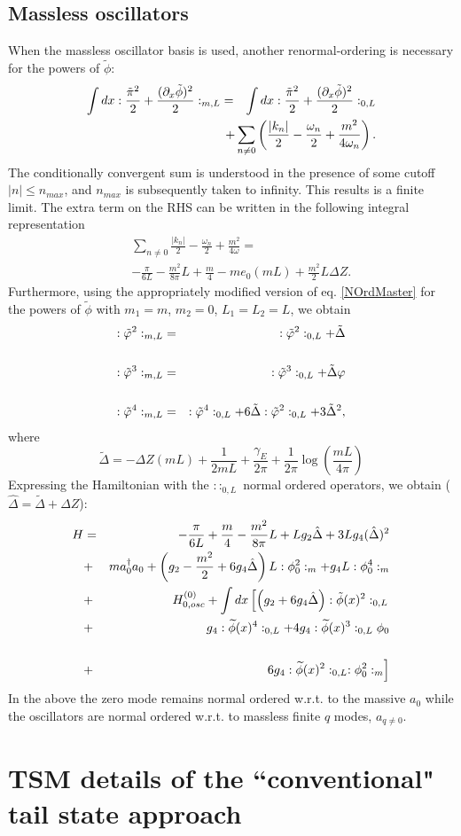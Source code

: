 \documentclass[twocolumn,secnumarabic,amssymb, nobibnotes, aps, prd]{revtex4-2}
\newcommand{\be}{\begin{equation}}
\newcommand{\ee}{\end{equation}}
\newcommand{\bea}{\begin{eqnarray}}
\newcommand{\eea}{\end{eqnarray}}
\begin{document}
\subsection{Massless oscillators}
When the massless oscillator basis is used, another renormal-ordering is necessary
for the powers of $\tilde\phi$:
\bea
\intop dx :\frac{\tilde\pi^2}{2}+\frac{(\partial_x \tilde\phi)^2}{2}:_{m,L}&=&\intop dx :\frac{\tilde\pi^2}{2}+\frac{(\partial_x \tilde\phi)^2}{2}:_{0,L}\nonumber\\
&&\hskip -.5in + \sum_{n\neq 0} \left(\frac{|k_n|}{2}-\frac{\omega_n}{2}+\frac{m^2}{4\omega_n}\right).
\eea
The conditionally convergent sum is understood in the presence of some cutoff $|n|\leq n_{max}$, and $n_{max}$ is subsequently taken to infinity. This results is a finite limit.
The extra term on the RHS can be written in the following integral representation
\bea
&&\sum_{n\neq 0} \frac{|k_n|}{2}-\frac{\omega_n}{2}+\frac{m^2}{4\omega}=\nonumber\\
&&-\frac{\pi}{6L}-\frac{m^2}{8\pi}L+\frac{m}{4}-me_0(mL)+\frac{m^2}{2}L\Delta Z.
\eea
Furthermore, using the appropriately modified version of eq. \eqref{NOrdMaster} for the powers of $\tilde\phi$ with $m_1=m$, $m_2=0$, $L_1=L_2=L$,
we obtain
\bea
:\tilde\varphi^2:_{m,L}&=&:\tilde\varphi^2:_{0,L}+\tilde\Delta\cr\cr
:\tilde\varphi^3:_{m,L}&=&:\tilde\varphi^3:_{0,L}+\tilde\Delta \varphi\cr\cr
:\tilde\varphi^4:_{m,L}&=&:\tilde\varphi^4:_{0,L}+6\tilde\Delta:\tilde\varphi^2:_{0,L}+3\tilde\Delta^2,
\eea
where
\be
\tilde\Delta= -\Delta Z(mL)+\frac{1}{2 m L}+\frac{\gamma_E}{2\pi}+\frac{1}{2\pi}\log\left(\frac{mL}{4\pi}\right)
\ee
Expressing the Hamiltonian with the $::_{0,L}$ normal ordered operators, we obtain
($\hat\Delta=\tilde\Delta+\Delta Z$):
\bea
H&=&-\frac{\pi}{6L}+\frac{m}{4}-\frac{m^2}{8\pi}L+L g_2\hat\Delta  + 3Lg_4(\hat\Delta)^2\nonumber\\
&+&m a_0^\dagger a_0+\left(g_2-\frac{m^2}{2}+6g_4\hat\Delta \right)L :\phi_0^2:_m+g_4 L :\phi_0^4:_m\nonumber\\
&+&H_{0,osc}^{(0)}+\intop dx \left[\left(g_2+6g_4\hat\Delta\right) :\tilde\phi(x)^2:_{0,L}\right.\nonumber\\
&+&g_4 :\widetilde{\phi}(x)^4:_{0,L}+4g_4:\widetilde{\phi}(x)^3:_{0,L}\phi_0\cr\cr
&+&\left.6g_4:\widetilde{\phi}(x)^2:_{0,L}:\phi_0^2:_{m}\right]
\eea
In the above the zero mode remains normal ordered w.r.t. to the massive $a_0$ while the oscillators are normal ordered w.r.t. to massless finite $q$ modes, $a_{q\neq0}$.

\section{TSM details of the ``conventional" tail state approach}\label{AppZMExDetails} 
\end{document}
